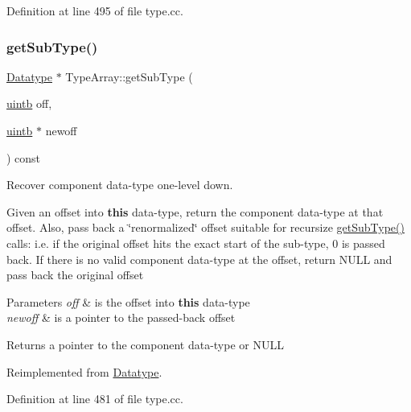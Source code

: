 Definition at line 495 of file type.\+cc.

\mbox{\label{class_type_array_a47579d472b40e0cdf7ecb95da258e870}} 
\subsubsection{\texorpdfstring{getSubType()}{getSubType()}}
{\footnotesize\ttfamily \mbox{\hyperlink{class_datatype}{Datatype}} $\ast$ Type\+Array\+::get\+Sub\+Type (\begin{DoxyParamCaption}\item[{\mbox{\hyperlink{types_8h_a2db313c5d32a12b01d26ac9b3bca178f}{uintb}}}]{off,  }\item[{\mbox{\hyperlink{types_8h_a2db313c5d32a12b01d26ac9b3bca178f}{uintb}} $\ast$}]{newoff }\end{DoxyParamCaption}) const\hspace{0.3cm}{\ttfamily [virtual]}}



Recover component data-\/type one-\/level down. 

Given an offset into {\bfseries{this}} data-\/type, return the component data-\/type at that offset. Also, pass back a \char`\"{}renormalized\char`\"{} offset suitable for recursize \mbox{\hyperlink{class_type_array_a47579d472b40e0cdf7ecb95da258e870}{get\+Sub\+Type()}} calls\+: i.\+e. if the original offset hits the exact start of the sub-\/type, 0 is passed back. If there is no valid component data-\/type at the offset, return N\+U\+LL and pass back the original offset 
\begin{DoxyParams}{Parameters}
{\em off} & is the offset into {\bfseries{this}} data-\/type \\
\hline
{\em newoff} & is a pointer to the passed-\/back offset \\
\hline
\end{DoxyParams}
\begin{DoxyReturn}{Returns}
a pointer to the component data-\/type or N\+U\+LL 
\end{DoxyReturn}


Reimplemented from \mbox{\hyperlink{class_datatype_ac310ccfdc47d145f10699fa1e14e73b4}{Datatype}}.



Definition at line 481 of file type.\+cc.

\mbox{\label{class_type_array_a556eb708ac21f5a9132efbf865a34831}} 

